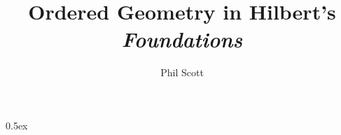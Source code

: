 \documentclass[phd,cisa]{infthesis}
\title{Ordered Geometry in Hilbert's \emph{Foundations}}
\author{Phil Scott}
\begin{document}
\begin{preliminary}

\maketitle


\standarddeclaration

\tableofcontents

\end{preliminary}

\parindent 0pt\parskip 0.5ex

%





















\appendix





\end{document}
